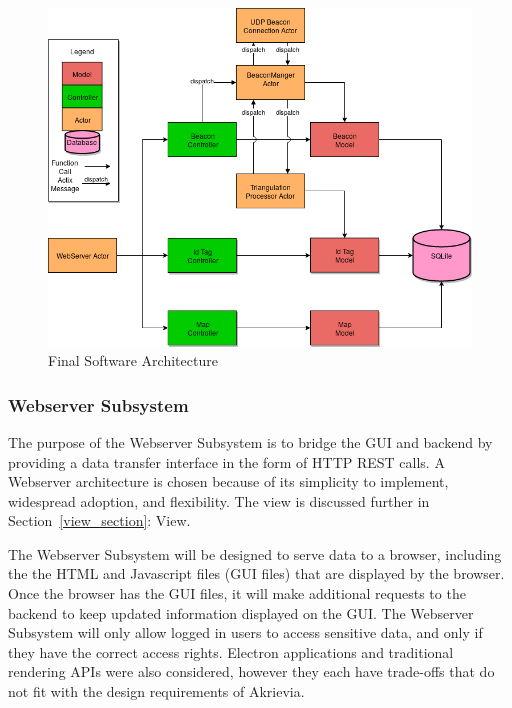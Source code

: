 \bigskip
\begin{figure}[H]
	\centering
    \includegraphics[scale=0.55]{images/prototype_software_arch.png}
    \caption{Final Software Architecture}
    \label{software_final_arch}
\end{figure}

\bigskip
\subsubsection{Webserver Subsystem}
\label{webserver_section}
\medskip
The purpose of the Webserver Subsystem is to bridge the GUI and backend by providing a data transfer interface in the form of HTTP REST calls.
A Webserver architecture is chosen because of its simplicity to implement, widespread adoption, and flexibility.
The view is discussed further in Section~\ref{view_section}: View.

\bigskip
The Webserver Subsystem will be designed to serve data to a browser, including the the HTML and Javascript files (GUI files) that are displayed by the browser.
Once the browser has the GUI files, it will make additional requests to the backend to keep updated information displayed on the GUI.
The Webserver Subsystem will only allow logged in users to access sensitive data, and only if they have the correct access rights.
Electron applications and traditional rendering APIs were also considered, however they each have trade-offs that do not fit with the design requirements of Akrievia.

